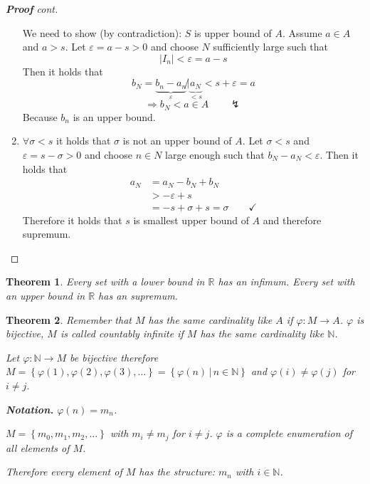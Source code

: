 \documentclass[a4paper,landscape,twocolumn]{article}
\newtheorem{theorem}{Theorem}
\newcommand\set[1]{\left\{#1\right\}}
\newcommand\setdef[2]{\left\{#1\,|\,#2\right\}}
\newcommand\abs[1]{\left|#1\right|}
\begin{document}
\begin{proof}[\textbf{Proof} cont]
\begin{enumerate}
      We need to show (by contradiction):
      $S$ is upper bound of $A$. Assume $a \in A$ and $a > s$.
      Let $\varepsilon = a - s > 0$ and choose $N$ sufficiently large such that
      \[ \abs{I_n} < \varepsilon = a - s \]
      Then it holds that
      \[
          b_N
          = \underbrace{b_n - a_n}_{\varepsilon} \not|
          \underbrace{a_N}_{< s} < s + \varepsilon
          = a
      \]
      \[ \Rightarrow b_N < a \in A \qquad\lightning \]
      Because $b_n$ is an upper bound.

    \item
      $\forall \sigma < s$ it holds that $\sigma$ is not an upper bound of $A$.
      Let $\sigma < s$ and $\varepsilon = s - \sigma > 0$ and choose $n \in N$
      large enough such that $b_N - a_N < \varepsilon$. Then it holds that
      \begin{align*}
        a_N &= a_N - b_N + b_N \\
            &> -\varepsilon + s \\
            &= -s + \sigma + s = \sigma \qquad \checkmark
      \end{align*}
      Therefore it holds that $s$ is smallest upper bound of $A$ and therefore
      supremum.
  \end{enumerate}
\end{proof}

\begin{theorem}
  Every set with a lower bound in $\mathbb R$ has an infimum.
  Every set with an upper bound in $\mathbb R$ has an supremum.
\end{theorem}

\begin{theorem}
  Remember that $M$ has the same cardinality like $A$ if $\varphi: M \rightarrow A$.
  $\varphi$ is bijective, $M$ is called countably infinite
  if $M$ has the same cardinality like $\mathbb N$.

  Let $\varphi: \mathbb N \rightarrow M$ be bijective therefore
  $M = \set{\varphi(1), \varphi(2), \varphi(3), \ldots} = \setdef{\varphi(n)}{n \in \mathbb N}$
  and $\varphi(i) \neq \varphi(j)$ for $i \neq j$.

  \textbf{Notation.} $\varphi(n) = m_n$.

  $M = \set{m_0, m_1, m_2, \ldots}$ with $m_i \neq m_j$ for $i \neq j$.
  $\varphi$ is a complete enumeration of all elements of $M$.

  Therefore every element of $M$ has the structure: $m_n$ with $i \in \mathbb N$.
\end{theorem}
\end{document}
